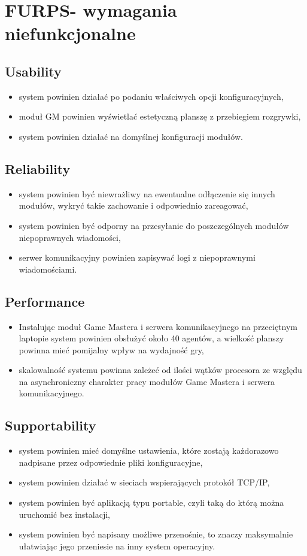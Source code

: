 \documentclass[Dokumentacja.tex]{subfiles}
\begin{document}
\section{FURPS- wymagania niefunkcjonalne}
\subsection{Usability}
\begin{itemize}
    \item system powinien działać po podaniu właściwych opcji konfiguracyjnych,
    \item moduł GM powinien wyświetlać estetyczną planszę z przebiegiem rozgrywki,
    \item system powinien działać na domyślnej konfiguracji modułów.
\end{itemize}

\subsection{Reliability}
\begin{itemize}
    \item system powinien być niewrażliwy na ewentualne odłączenie się innych modułów,
    wykryć takie zachowanie i odpowiednio zareagować,
    \item system powinien być odporny na przesyłanie do poszczególnych modułów niepoprawnych wiadomości,
    \item serwer komunikacyjny powinien zapisywać logi z niepoprawnymi wiadomościami.
\end{itemize}

\subsection{Performance}
\begin{itemize}
    \item Instalując moduł Game Mastera i serwera komunikacyjnego na przeciętnym laptopie system powinien obsłużyć około 40 agentów,
    a wielkość planszy powinna mieć pomijalny wpływ na wydajność gry,
    \item skalowalność systemu powinna zależeć od ilości wątków procesora ze względu na asynchroniczny charakter pracy modułów
    Game Mastera i serwera komunikacyjnego.
\end{itemize}

\subsection{Supportability}
\begin{itemize}
    \item system powinien mieć domyślne ustawienia, które zostają każdorazowo nadpisane przez odpowiednie pliki konfiguracyjne,
    \item system powinien działać w sieciach wspierających protokół TCP/IP,
    \item system powinien być aplikacją typu portable, czyli taką do którą można uruchomić bez instalacji,
    \item system powinien być napisany możliwe przenośnie, to znaczy maksymalnie ułatwiając jego przeniesie na inny system operacyjny.
\end{itemize}
\end{document}
